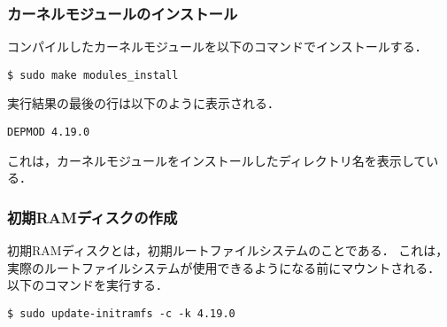 \documentclass[12pt]{jsarticle}
\begin{document}
\subsubsection{カーネルモジュールのインストール}
コンパイルしたカーネルモジュールを以下のコマンドでインストールする．
\begin{verbatim}
$ sudo make modules_install
\end{verbatim}
実行結果の最後の行は以下のように表示される．
\begin{verbatim}
DEPMOD 4.19.0
\end{verbatim}
これは，カーネルモジュールをインストールしたディレクトリ名を表示している．

\subsubsection{初期RAMディスクの作成}
初期RAMディスクとは，初期ルートファイルシステムのことである．
これは，実際のルートファイルシステムが使用できるようになる前にマウントされる．
以下のコマンドを実行する．
\begin{verbatim}
$ sudo update-initramfs -c -k 4.19.0
\end{verbatim}
\end{document}
